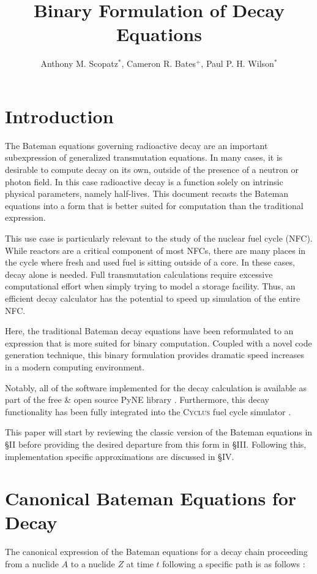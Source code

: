 \documentclass{anstrans}
\title{Binary Formulation of Decay Equations}
\author{Anthony M. Scopatz$^{*}$, Cameron R. Bates$^{+}$, Paul P. H. Wilson$^{*}$}
\institute{
$^{*}$The University of Wisconsin-Madison, 1500 Engineering Drive, Madison,
WI\\
$^{+}$The University of California Berkeley, Etcheverry Hall, MC 1730, Berkeley, CA
}
\newcommand{\cyclus}{\textsc{Cyclus}\xspace}
\begin{document}
\section{Introduction}

The Bateman equations governing radioactive decay are an important 
subexpression of generalized transmutation equations. In many cases, it is 
desirable to compute decay on its own, outside of the presence of a neutron 
or photon field.  In this case radioactive decay is a function solely on 
intrinsic physical parameters, namely half-lives. This document recasts the 
Bateman equations into a form that is better suited for computation than the 
traditional expression.

This use case is particularly relevant to the study of the nuclear fuel 
cycle (NFC). While reactors are a critical component of most NFCs, there 
are many places in the cycle where fresh and used fuel is sitting outside 
of a core. In these cases, decay alone is needed. Full transmutation 
calculations require excessive computational effort when simply trying to 
model a storage facility. Thus, an efficient decay calculator has the 
potential to speed up simulation of the entire NFC.

Here, the traditional Bateman decay equations have been reformulated to 
an expression that is more suited for binary computation. Coupled with a 
novel code generation technique, this binary formulation provides 
dramatic speed increases in a modern computing environment. 

Notably, all of the software implemented for the decay calculation is 
available as part of the free \& open source PyNE library 
\cite{pyne2014,Bates2014}. Furthermore, this decay functionality has
been fully integrated into the \cyclus fuel cycle simulator
\cite{cyclus2015,cyclus_v1.2}.

This paper will start by reviewing the classic version of the Bateman 
equations in \S II before providing the desired departure from 
this form in \S III. Following this, implementation specific 
approximations are discussed in \S IV.

\section{Canonical Bateman Equations for Decay}
\label{canon}
The canonical expression of the Bateman equations for a decay chain 
proceeding from a nuclide $A$ to a nuclide $Z$ at time 
$t$ following a specific path is as follows \cite{Cetnar2006640}:
\end{document}
